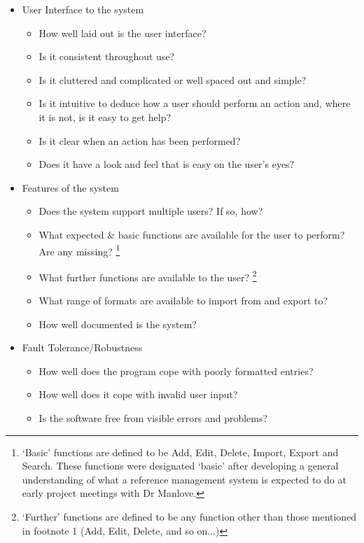 \documentclass{l4proj}
\begin{document}
\begin{itemize}
	\item User Interface to the system
	\begin{itemize}
		\item How well laid out is the user interface? 
		\item Is it consistent throughout use?
		\item Is it cluttered and complicated or well spaced out and simple?
		\item Is it intuitive to deduce how a user should perform an action and, where it is not, is it easy to get help?
		\item Is it clear when an action has been performed?
		\item Does it have a look and feel that is easy on the user's eyes?
	\end{itemize}
	\item Features of the system
	\begin{itemize}
		\item Does the system support multiple users? If so, how?
		\item What expected \& basic functions are available for the user to perform? Are any missing? \footnote{`Basic' functions are defined to be Add, Edit, Delete, Import, Export and Search. These functions were designated `basic' after developing a general understanding of what a reference management system is expected to do at early project meetings with Dr Manlove.} %
		\item What further functions are available to the user? \footnote{`Further' functions are defined to be any function other than those mentioned in footnote 1 (Add, Edit, Delete, and so on...)}
		\item What range of formats are available to import from and export to?
		\item How well documented is the system?
	\end{itemize}
	\item Fault Tolerance/Robustness
	\begin{itemize}	
		\item How well does the program cope with poorly formatted entries?
		\item How well does it cope with invalid user input?
		\item Is the software free from visible errors and problems?
	\end{itemize}
\end{itemize}
\end{document}
